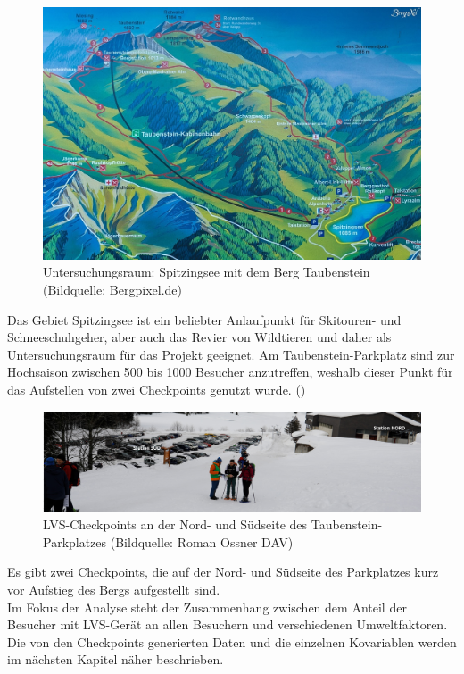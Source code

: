 \documentclass[12pt]{scrreprt}
\begin{document}
\begin{figure}[H]
	\centering
	\includegraphics[width=\linewidth]{plots/spitzingsee}
	\caption{Untersuchungsraum: Spitzingsee mit dem Berg Taubenstein \\ (Bildquelle: Bergpixel.de)}
	\label{pic:spitzingsee}	
\end{figure}
\noindent Das Gebiet Spitzingsee ist ein beliebter Anlaufpunkt für Skitouren- und Schneeschuhgeher, aber auch das Revier von Wildtieren und daher als Untersuchungsraum für das Projekt geeignet. Am Taubenstein-Parkplatz sind zur Hochsaison zwischen 500 bis 1000 Besucher anzutreffen, weshalb dieser Punkt für das Aufstellen von zwei Checkpoints genutzt wurde. (\cite{skigebiete2018}) %
\begin{figure}[H]
	\centering
	\includegraphics[width=\linewidth]{plots/checkpoint}
	\caption{LVS-Checkpoints an der Nord- und Südseite des Taubenstein-Parkplatzes (Bildquelle: Roman Ossner DAV)}
	\label{pic:checkpoint}	
\end{figure}
\noindent Es gibt zwei Checkpoints, die auf der Nord- und Südseite des Parkplatzes kurz vor Aufstieg des Bergs aufgestellt sind. \\
Im Fokus der Analyse steht der Zusammenhang zwischen dem Anteil der Besucher mit LVS-Gerät an allen Besuchern und verschiedenen Umweltfaktoren. Die von den Checkpoints generierten Daten und die einzelnen Kovariablen werden im nächsten Kapitel näher beschrieben. 
\end{document}
